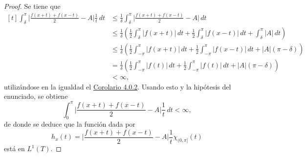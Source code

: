 \documentclass[a4paper, 11pt, oneside]{report}
\begin{document}
\begin{proof}
  Se tiene que
  \[\begin{aligned}[t]
    \int_{\delta}^\pi \biggl|\frac{f(x+t)+f(x-t)}{2}-A\biggr| \frac{1}{t} \, dt &\leq \frac{1}{\delta} \int_{\delta}^\pi \biggl|\frac{f(x+t)+f(x-t)}{2}-A\biggr| \, dt \\
    &\leq \frac{1}{\delta}\left(\frac{1}{2}\int_{\delta}^\pi |f(x+t)| \, dt+\frac{1}{2}\int_{\delta}^\pi |f(x-t)| \, dt + \int_{\delta}^\pi |A| \, dt\right) \\
    &\leq \frac{1}{\delta}\left(\frac{1}{2}\int_{-\pi}^\pi |f(x+t)| \, dt+\frac{1}{2}\int_{-\pi}^\pi |f(x-t)| \, dt + |A|(\pi - \delta)\right) \\
    &=  \frac{1}{\delta}\left(\frac{1}{2}\int_{-\pi}^\pi |f(t)| \, dt+\frac{1}{2}\int_{-\pi}^\pi |f(t)| \, dt + |A|(\pi - \delta)\right) \\
    &< \infty,
  \end{aligned}\]
  utilizándose en la igualdad el \hyperref[cor:4.0.2]{\color{c1}Corolario 4.0.2}. Usando esto y la hipótesis del enunciado, se obtiene
  \[\int_{0}^\pi \biggl|\frac{f(x+t)+f(x-t)}{2}-A\biggr| \frac{1}{t} \, dt < \infty,\]
  de donde se deduce que la función dada por 
  \[h_x(t) = \biggl|\frac{f(x+t)+f(x-t)}{2}-A\biggr|\frac{1}{t}\chi_{(0,\pi]}(t)\] está en $L^1(T)$.


\end{proof}
\end{document}
